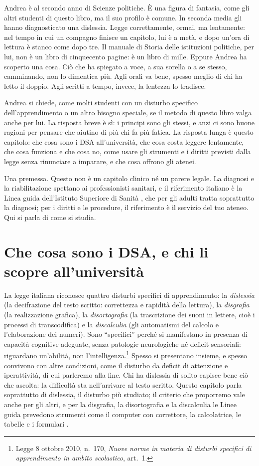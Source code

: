 Andrea è al secondo anno di Scienze politiche. È una figura di
fantasia, come gli altri studenti di questo libro, ma il suo profilo è
comune. In seconda media gli hanno diagnosticato una dislessia. Legge
correttamente, ormai, ma lentamente: nel tempo in cui un compagno
finisce un capitolo, lui è a metà, e dopo un'ora di lettura è stanco
come dopo tre. Il manuale di Storia delle istituzioni politiche, per
lui, non è un libro di cinquecento pagine: è un libro di mille. Eppure
Andrea ha scoperto una cosa. Ciò che ha spiegato a voce, a sua sorella
o a se stesso, camminando, non lo dimentica più. Agli orali va bene,
spesso meglio di chi ha letto il doppio. Agli scritti a tempo,
invece, la lentezza lo tradisce.

Andrea si chiede, come molti studenti con un disturbo specifico
dell'apprendimento o un altro bisogno speciale, se il metodo di questo
libro valga anche per lui. La risposta breve è sì: i principi sono gli
stessi, e anzi ci sono buone ragioni per pensare che aiutino di più chi
fa più fatica. La risposta lunga è questo capitolo: che cosa sono i
DSA all'università, che cosa costa leggere lentamente, che cosa
funziona e che cosa no, come usare gli strumenti e i diritti previsti
dalla legge senza rinunciare a imparare, e che cosa offrono gli atenei.

Una premessa. Questo non è un capitolo clinico né un parere legale. La
diagnosi e la riabilitazione spettano ai professionisti sanitari, e il riferimento italiano è la Linea guida dell'Istituto Superiore di Sanità \parencite{iss2022}, che per gli adulti tratta soprattutto la diagnosi; per i diritti e le procedure, il
riferimento è il servizio del tuo ateneo. Qui si parla di come si
studia.

\section{Che cosa sono i DSA, e chi li scopre all'università}

La legge italiana riconosce quattro disturbi specifici di
apprendimento: la \emph{dislessia} (la decifrazione del testo scritto: correttezza e rapidità della lettura), la \emph{disgrafia} (la realizzazione grafica), la \emph{disortografia} (la trascrizione dei suoni in lettere, cioè i processi di transcodifica) e la \emph{discalculia} (gli automatismi del calcolo e l'elaborazione dei numeri). Sono \enquote{specifici} perché si
manifestano in presenza di capacità cognitive adeguate, senza
patologie neurologiche né deficit sensoriali: riguardano un'abilità,
non l'intelligenza.\footnote{Legge 8 ottobre 2010, n.~170, \emph{Nuove
norme in materia di disturbi specifici di apprendimento in ambito
scolastico}, art.~1.} Spesso si presentano insieme, e spesso convivono con altre condizioni, come il disturbo da deficit di attenzione e iperattività, di cui parleremo alla fine. Chi ha dislessia di solito capisce bene ciò che ascolta: la difficoltà sta nell'arrivare al testo scritto. Questo capitolo parla soprattutto di dislessia, il disturbo più studiato; il criterio che proporremo vale anche per gli altri, e per la disgrafia, la disortografia e la discalculia le Linee guida prevedono strumenti come il computer con correttore, la calcolatrice, le tabelle e i formulari \parencite{cnudd2024}.

